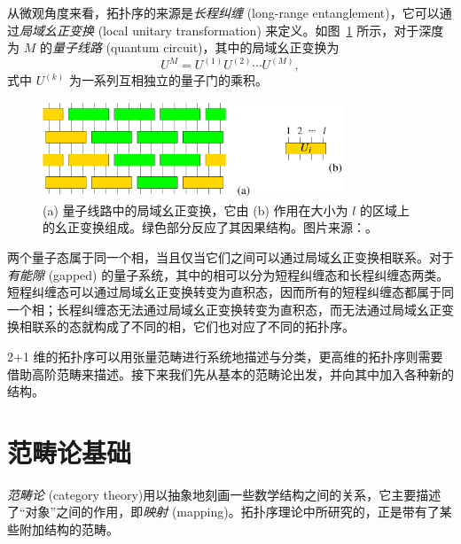 从微观角度来看，拓扑序的来源是\emph{长程纠缠} (long-range entanglement)，它可以通过\emph{局域幺正变换} (local unitary transformation) 来定义。如图~\ref{fig:lu-transformation} 所示，对于深度为 $M$ 的\emph{量子线路} (quantum circuit)，其中的局域幺正变换为
\begin{equation}
  U^M = U^{(1)} U^{(2)} \cdots U^{(M)},
\end{equation}
式中 $U^{(k)}$ 为一系列互相独立的量子门的乘积。

\begin{figure}[htb]
  \centering
  \includegraphics[width=0.8\textwidth]{images/lu-transformation.pdf}
  \caption[量子线路中的局域幺正变换]{(a) 量子线路中的局域幺正变换，它由 (b) 作用在大小为 $l$ 的区域上的幺正变换组成。绿色部分反应了其因果结构。图片来源：\parencite{wen2013topological}。}
  \label{fig:lu-transformation}
\end{figure}

两个量子态属于同一个相，当且仅当它们之间可以通过局域幺正变换相联系。对于\emph{有能隙} (gapped) 的量子系统，其中的相可以分为短程纠缠态和长程纠缠态两类。短程纠缠态可以通过局域幺正变换转变为直积态，因而所有的短程纠缠态都属于同一个相；长程纠缠态无法通过局域幺正变换转变为直积态，而无法通过局域幺正变换相联系的态就构成了不同的相，它们也对应了不同的拓扑序。

2+1 维的拓扑序可以用张量范畴进行系统地描述与分类，更高维的拓扑序则需要借助高阶范畴来描述\cite{baez1997introduction,kong2014braided,kong2015boundary,kong2020classification}。接下来我们先从基本的范畴论出发，并向其中加入各种新的结构。

\section{范畴论基础}

\emph{范畴论} (category theory)\cite{baez2011physics,maclane2013categories,beer2018categories}用以抽象地刻画一些数学结构之间的关系，它主要描述了“对象”之间的作用，即\emph{映射} (mapping)。拓扑序理论中所研究的，正是带有了某些附加结构的范畴。

